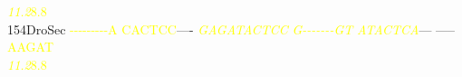 \documentclass[11pt,twoside,reqno,a4paper]{article}
\begin{document}
{\hspace*{4\charwidth}\hspace*{7\charwidth}\hspace*{1\charwidth}\hspace*{1\charwidth}\hspace*{20\charwidth}\textit{\textcolor{yellow}{11.2}}\hspace*{1\charwidth}\hspace*{1\charwidth}\hspace*{1\charwidth}\hspace*{31\charwidth}\textcolor{yellow}{8.8}\hspace*{1\charwidth}\\
154\hspace*{1\charwidth}DroSec	\textcolor{yellow}{-}\textcolor{yellow}{-}\textcolor{yellow}{-}\textcolor{yellow}{-}\textcolor{yellow}{-}\textcolor{yellow}{-}\textcolor{yellow}{-}\textcolor{yellow}{-}\textcolor{yellow}{-}\textcolor{yellow}{A}	\textcolor{yellow}{C}\textcolor{yellow}{A}\textcolor{yellow}{C}\textcolor{yellow}{T}\textcolor{yellow}{C}\textcolor{yellow}{C}----	\textit{\textcolor{yellow}{G}}\textit{\textcolor{yellow}{A}}\textit{\textcolor{yellow}{G}}\textit{\textcolor{yellow}{A}}\textit{\textcolor{yellow}{T}}\textit{\textcolor{yellow}{A}}\textit{\textcolor{yellow}{C}}\textit{\textcolor{yellow}{T}}\textit{\textcolor{yellow}{C}}\textit{\textcolor{yellow}{C}}	\textit{\textcolor{yellow}{G}}\textit{\textcolor{yellow}{-}}\textit{\textcolor{yellow}{-}}\textit{\textcolor{yellow}{-}}\textit{\textcolor{yellow}{-}}\textit{\textcolor{yellow}{-}}\textit{\textcolor{yellow}{-}}\textit{\textcolor{yellow}{-}}\textit{\textcolor{yellow}{G}}\textit{\textcolor{yellow}{T}}	\textit{\textcolor{yellow}{A}}\textit{\textcolor{yellow}{T}}\textit{\textcolor{yellow}{A}}\textit{\textcolor{yellow}{C}}\textit{\textcolor{yellow}{T}}\textit{\textcolor{yellow}{C}}\textit{\textcolor{yellow}{A}}---	-----\textcolor{yellow}{A}\textcolor{yellow}{A}\textcolor{yellow}{G}\textcolor{yellow}{A}\textcolor{yellow}{T}	\\
\hspace*{4\charwidth}\hspace*{7\charwidth}\hspace*{1\charwidth}\hspace*{1\charwidth}\hspace*{20\charwidth}\textit{\textcolor{yellow}{11.2}}\hspace*{1\charwidth}\hspace*{1\charwidth}\hspace*{1\charwidth}\hspace*{31\charwidth}\textcolor{yellow}{8.8}\hspace*{1\charwidth}\\
}
\end{document}
